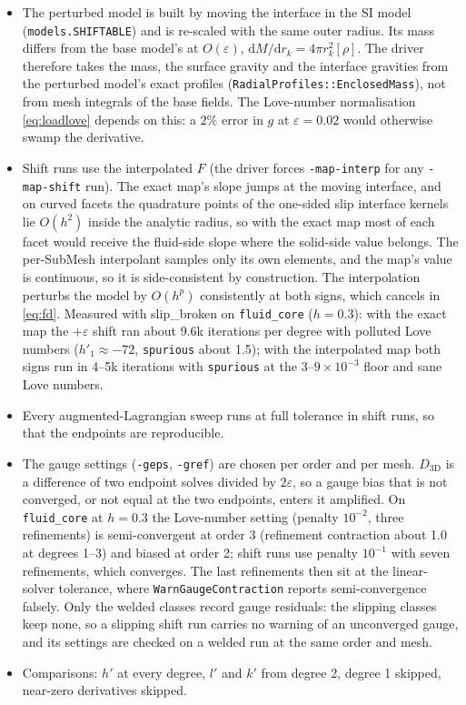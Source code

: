 \documentclass[11pt]{article}
\numberwithin{equation}{section}
\newcommand{\eps}{\varepsilon}
\newcommand{\code}[1]{\texttt{#1}}
\begin{document}
\begin{itemize}[leftmargin=*]
\item The perturbed model is built by moving the interface in the SI
  model (\code{models.SHIFTABLE}) and is re-scaled with the same outer
  radius. Its mass differs from the base model's at $O(\eps)$,
  $\mathrm{d}M/\mathrm{d}r_k = 4\pi r_k^2[\rho]$. The driver therefore
  takes the mass, the surface gravity and the interface gravities from
  the perturbed model's exact profiles (\code{RadialProfiles::EnclosedMass}),
  not from mesh integrals of the base fields. The Love-number
  normalisation \eqref{eq:loadlove} depends on this: a $2\%$ error in $g$
  at $\eps=0.02$ would otherwise swamp the derivative.
\item Shift runs use the interpolated $F$ (the driver forces
  \code{-map-interp} for any \code{-map-shift} run). The exact map's slope
  jumps at the moving interface, and on curved facets the quadrature points
  of the one-sided slip interface kernels lie $O(h^2)$ inside the analytic
  radius, so with the exact map most of each facet would receive the
  fluid-side slope where the solid-side value belongs. The per-SubMesh
  interpolant samples only its own elements, and the map's value is
  continuous, so it is side-consistent by construction. The interpolation
  perturbs the model by $O(h^p)$ consistently at both signs, which cancels
  in \eqref{eq:fd}. Measured with slip\_broken on \code{fluid\_core}
  ($h=0.3$): with the exact map the $+\eps$ shift ran about 9.6k iterations
  per degree with polluted Love numbers ($h'_1\approx-72$, \code{spurious}
  about 1.5); with the interpolated map both signs run in 4--5k iterations
  with \code{spurious} at the $3$--$9\times10^{-3}$ floor and sane Love
  numbers.
\item Every augmented-Lagrangian sweep runs at full tolerance in shift
  runs, so that the endpoints are reproducible.
\item The gauge settings (\code{-geps}, \code{-gref}) are chosen per order
  and per mesh. $D_{3\text{D}}$ is a difference of two endpoint solves
  divided by $2\eps$, so a gauge bias that is not converged, or not
  equal at the two endpoints, enters it amplified. On \code{fluid\_core} at
  $h=0.3$ the Love-number setting (penalty $10^{-2}$, three refinements)
  is semi-convergent at order 3 (refinement contraction about 1.0 at
  degrees 1--3) and biased at order 2; shift runs use penalty $10^{-1}$
  with seven refinements, which converges. The last refinements then sit at
  the linear-solver tolerance, where \code{WarnGaugeContraction} reports
  semi-convergence falsely. Only the welded classes record gauge residuals:
  the slipping classes keep none, so a slipping shift run carries no
  warning of an unconverged gauge, and its settings are checked on a
  welded run at the same order and mesh.
\item Comparisons: $h'$ at every degree, $l'$ and $k'$ from degree 2,
  degree 1 skipped, near-zero derivatives skipped.
\end{itemize}
\end{document}
